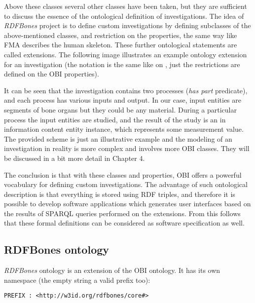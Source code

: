 Above these classes several other classes have been taken, but they are sufficient to discuss the essence of the ontological definition of investigations. The idea of \textit{RDFBones} project is to define custom investigations by defining subclasses of the above-mentioned classes, and restriction on the properties, the same way like FMA describes the human skeleton. These further ontological statements are called extensions. The following image illustrates an example ontology extension for an investigation (the notation is the same like on , just the restrictions are defined on the OBI properties). 


It can be seen that the investigation contains two processes (\textit{has part} predicate), and each process has various inputs and output. In our case, input entities are segments of bone organs but they could be any material. During a particular process the input entities are studied, and the result of the study is an in information content entity instance, which represents some measurement value. The provided scheme is just an illustrative example and the modeling of an investigation in reality is more complex and involves more OBI classes. They will be discussed in a bit more detail in Chapter 4.

The conclusion is that with these classes and properties, OBI offers a powerful vocabulary for defining custom investigations. The advantage of such ontological description is that everything is stored using RDF triples, and therefore it is possible to develop software applications which generates user interfaces based on the results of SPARQL queries performed on the extensions. From this follows that these formal definitions can be considered as software specification as well.

\subsection{RDFBones ontology} \label{rdfbones}

\textit{RDFBones} ontology is an extension of the OBI ontology. It has its own namespace (the empty string a valid prefix too): 

\begin{lstlisting}[basicstyle=\footnotesize, captionpos=b, caption=RDFBones namespace, label=lst:sparql, belowskip=1em, aboveskip=2em,
frame=single]
PREFIX : <http://w3id.org/rdfbones/core#>
\end{lstlisting}

